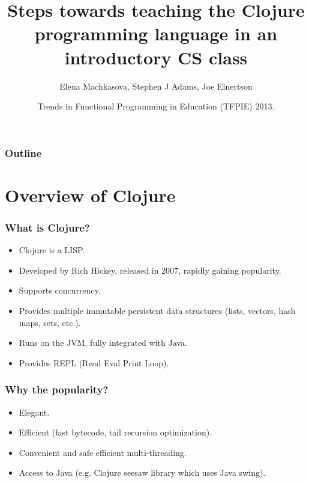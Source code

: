 \documentclass{beamer}
\begin{document}
\title{Steps towards teaching the Clojure programming language in an introductory CS  class}
\author{Elena Machkasova, Stephen J Adams, Joe Einertson}
\date[May 13, 2013]  
{Trends in Functional Programming in Education (TFPIE) 2013.}

\begin{frame}
  \titlepage
\end{frame}

\begin{frame}

  \frametitle{Outline}
\tableofcontents
\end{frame}

\section{Overview of Clojure}

\begin{frame}
\frametitle{What is Clojure?}
\begin{itemize}
\item Clojure is a LISP.
\item Developed by Rich Hickey, released in 2007, rapidly gaining popularity. 
\item Supports concurrency.
\item Provides multiple immutable persistent data structures (lists, vectors, hash maps, sets, etc.).
\item Runs on the JVM, fully integrated with Java. 
\item Provides REPL (Read Eval Print Loop).
\end{itemize}
\end{frame}

\begin{frame}
\frametitle{Why the popularity?}
\begin{itemize}
\item Elegant.
\item Efficient (fast bytecode, tail recursion optimization).
\item Convenient and safe efficient multi-threading. 
\item Access to Java (e.g. Clojure seesaw library which uses Java swing). 
\end{itemize}
\end{frame}
\end{document}
